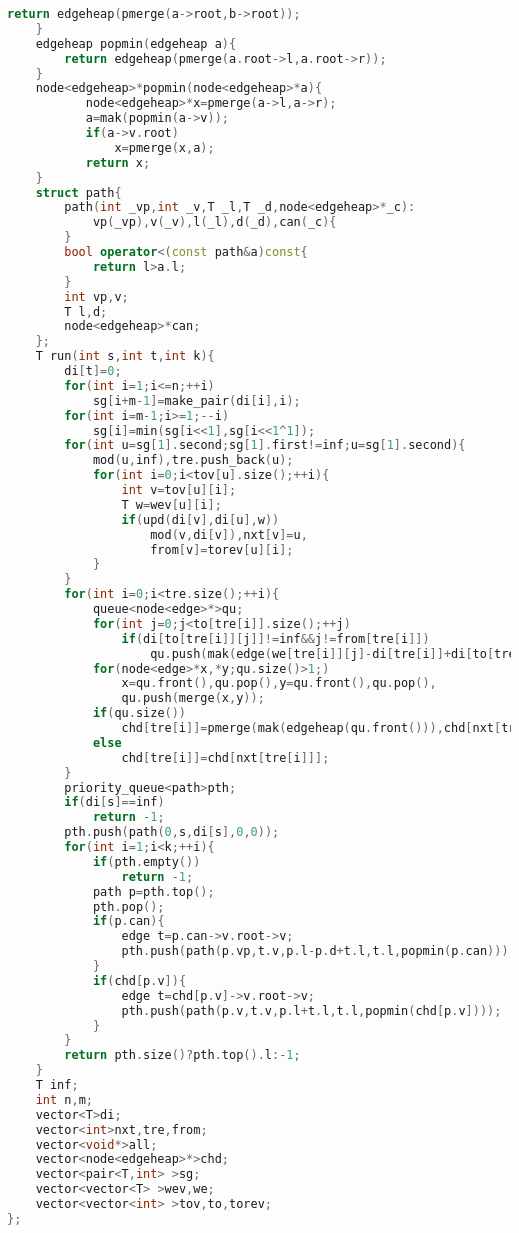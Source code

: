 \documentclass{book}
\begin{document}
\begin{lstlisting}[language=C++,title={K Shortest Path.hpp (5105 bytes, 170 lines)}]
        return edgeheap(pmerge(a->root,b->root));
    }
    edgeheap popmin(edgeheap a){
        return edgeheap(pmerge(a.root->l,a.root->r));
    }
    node<edgeheap>*popmin(node<edgeheap>*a){
           node<edgeheap>*x=pmerge(a->l,a->r);
           a=mak(popmin(a->v));
           if(a->v.root)
               x=pmerge(x,a);
           return x;
    }
    struct path{
        path(int _vp,int _v,T _l,T _d,node<edgeheap>*_c):
            vp(_vp),v(_v),l(_l),d(_d),can(_c){
        }
        bool operator<(const path&a)const{
            return l>a.l;
        }
        int vp,v;
        T l,d;
        node<edgeheap>*can;
    };
    T run(int s,int t,int k){
        di[t]=0;
        for(int i=1;i<=n;++i)
            sg[i+m-1]=make_pair(di[i],i);
        for(int i=m-1;i>=1;--i)
            sg[i]=min(sg[i<<1],sg[i<<1^1]);
        for(int u=sg[1].second;sg[1].first!=inf;u=sg[1].second){
            mod(u,inf),tre.push_back(u);
            for(int i=0;i<tov[u].size();++i){
                int v=tov[u][i];
                T w=wev[u][i];
                if(upd(di[v],di[u],w))
                    mod(v,di[v]),nxt[v]=u,
                    from[v]=torev[u][i];
            }
        }
        for(int i=0;i<tre.size();++i){
            queue<node<edge>*>qu;
            for(int j=0;j<to[tre[i]].size();++j)
                if(di[to[tre[i]][j]]!=inf&&j!=from[tre[i]])
                    qu.push(mak(edge(we[tre[i]][j]-di[tre[i]]+di[to[tre[i]][j]],to[tre[i]][j])));
            for(node<edge>*x,*y;qu.size()>1;)
                x=qu.front(),qu.pop(),y=qu.front(),qu.pop(),
                qu.push(merge(x,y));
            if(qu.size())
                chd[tre[i]]=pmerge(mak(edgeheap(qu.front())),chd[nxt[tre[i]]]);
            else
                chd[tre[i]]=chd[nxt[tre[i]]];
        }
        priority_queue<path>pth;
        if(di[s]==inf)
            return -1;
        pth.push(path(0,s,di[s],0,0));
        for(int i=1;i<k;++i){
            if(pth.empty())
                return -1;
            path p=pth.top();
            pth.pop();
            if(p.can){
                edge t=p.can->v.root->v;
                pth.push(path(p.vp,t.v,p.l-p.d+t.l,t.l,popmin(p.can)));
            }
            if(chd[p.v]){
                edge t=chd[p.v]->v.root->v;
                pth.push(path(p.v,t.v,p.l+t.l,t.l,popmin(chd[p.v])));
            }
        }
        return pth.size()?pth.top().l:-1;
    }
    T inf;
    int n,m;
    vector<T>di;
    vector<int>nxt,tre,from;
    vector<void*>all;
    vector<node<edgeheap>*>chd;
    vector<pair<T,int> >sg;
    vector<vector<T> >wev,we;
    vector<vector<int> >tov,to,torev;
};
\end{lstlisting}
\end{document}

